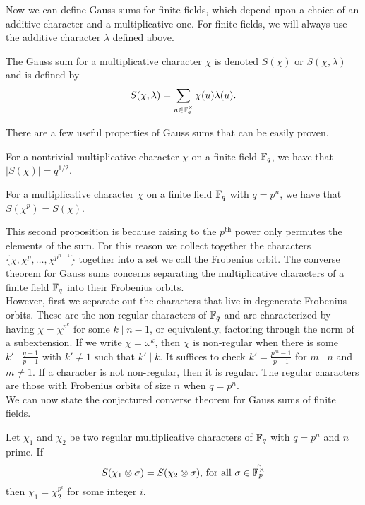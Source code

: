 Now we can define Gauss sums for finite fields, which depend upon a choice of an additive character and a multiplicative one. 
For finite fields, we will always use the additive character $\lambda$ defined above.
\begin{defn}\label{def:Gsum-FF}
The Gauss sum for a multiplicative character $\chi$ is denoted $S(\chi)$ or $S(\chi, \lambda)$ and is defined by \[S(\chi, \lambda) = \sum_{u \in \mathbb{F}_q^\times} \chi(u) \lambda(u).\]
\end{defn}
\noindent There are a few useful properties of Gauss sums that can be easily proven.
\begin{prop}
For a nontrivial multiplicative character $\chi$ on a finite field $\mathbb{F}_q$, we have that $|S(\chi)| = q^{1/2}$.
\end{prop}
\begin{prop}
For a multiplicative character $\chi$ on a finite field $\mathbb{F}_q$ with $q = p^n$, we have that $S(\chi^p) = S(\chi)$.
\end{prop}
This second proposition is because raising to the $p^\text{th}$ power only permutes the elements of the sum. 
For this reason we collect together the characters $\{\chi, \chi^{p}, \ldots, \chi^{p^{n-1}}\}$ together into a set we call the Frobenius orbit.
The converse theorem for Gauss sums concerns separating the multiplicative characters of a finite field $\mathbb{F}_q$ into their Frobenius orbits.\\

However, first we separate out the characters that live in degenerate Frobenius orbits. 
These are the non-regular characters of $\mathbb{F}_q$ and are characterized by having $\chi = \chi^{p^k}$ for some $k \mid n-1$, or equivalently, factoring through the norm of a subextension. 
If we write $\chi = \omega^k$, then $\chi$ is non-regular when there is some $k' \mid \frac{q-1}{p-1}$ with $k' \neq 1$ such that $k' \mid k$.
It suffices to check $k' = \frac{p^m - 1}{p-1}$ for $m \mid n$ and $m \neq 1$.
If a character is not non-regular, then it is regular. 
The regular characters are those with Frobenius orbits of size $n$ when $q = p^n$.\\

We can now state the conjectured converse theorem for Gauss sums of finite fields.
\begin{conj}[Nien]\label{conj:local-converse-FF}
Let $\chi_1$ and $\chi_2$ be two regular multiplicative characters of $\mathbb{F}_q$ with $q = p^n$ and $n$ prime. If \[S(\chi_1 \otimes \sigma) = S(\chi_2 \otimes \sigma)\text{, for all } \sigma \in \hat{\mathbb{F}_p^\times}\] then $\chi_1 = \chi_2^{p^i}$ for some integer $i$.
\end{conj}

